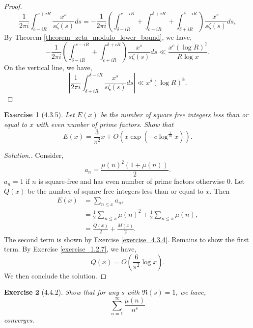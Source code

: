 \documentclass{article}
\newtheorem{exercise}{Exercise}[section]
\begin{document}
\begin{proof}
\begin{equation*}
  {\frac 1 {2\pi i}}\int_{c-iR}^{c+iR}{\frac {x^s} {s\zeta(s)}}ds = -{\frac 1 {2\pi i}}\left(\int_{\delta-iR}^{c-iR}+\int_{c+iR}^{\delta+iR}+\int_{\delta+iR}^{\delta-iR}\right){\frac {x^s} {s\zeta(s)}}ds,
\end{equation*}
By Theorem \ref{theorem_zeta_modulo_lower_bound}, we have,
\begin{equation*}
  -{\frac 1 {2\pi i}}\left(\int_{\delta-iR}^{c-iR}+\int_{c+iR}^{\delta+iR}\right){\frac {x^s} {s\zeta(s)}}ds \ll {\frac {x^c(\log R)^7} {R\log x}}.
\end{equation*}
On the vertical line, we have,
\begin{equation*}
  \left\vert{\frac 1 {2\pi i}}\int_{\delta+iR}^{\delta-iR}{\frac {x^s} {s\zeta(s)}}ds\right\vert \ll x^\delta(\log R)^8.
\end{equation*}
\end{proof}
\begin{exercise}[4.3.5]
  Let $E(x)$ be the number of square free integers less than or equal to $x$ with even number of prime factors. Show that 
  \begin{equation*}
    E(x) = {\frac 3 {\pi^2}}x+O(x\exp(-c\log^{{\frac 1 {10}}}x)).
  \end{equation*}
\end{exercise}
\begin{proof}[Solution.]
  Consider,
  \begin{equation*}
    a_n = {\frac{\mu(n)^2(1+\mu(n))}{2}}.
  \end{equation*}
  $a_n=1$ if $n$ is square-free and has even number of prime factors otherwise $0$. Let $Q(x)$ be the number of square free integers less than or equal to $x$. Then 
  \begin{align*}
    E(x) &=\sum_{n\leq x}a_n,\\
    & = {\frac 1 2}\sum_{n\leq x}\mu(n)^2+{\frac 1 2}\sum_{n\leq x}\mu(n),\\
    & = {\frac {Q(x)} 2}+{\frac {M(x)} 2}.
  \end{align*}
  The second term is shown by Exercise \ref{exercise_4.3.4}. Remains to show the first term. By Exercise \ref{exercise_1.2.7}, we have,
  \begin{equation*}
    Q(x) =O\left({\frac {6} {\pi^2}}\log x\right).
  \end{equation*}
  We then conclude the solution.
\end{proof}
\begin{exercise}[4.4.2]
  Show that for any $s$ with $\Re(s)=1$, we have,
  \begin{equation*}
    \sum_{n=1}^\infty {\frac {\mu(n)} {n^s}}
  \end{equation*}
  converges.
\end{exercise}
\end{document}
